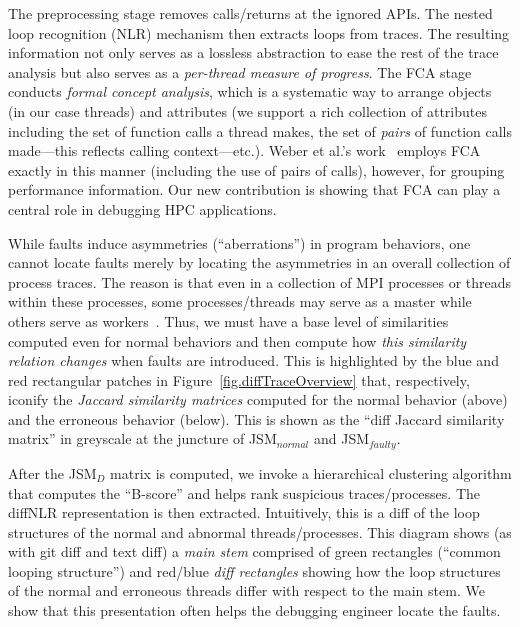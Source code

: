 The preprocessing stage removes calls/returns at the ignored APIs.
%
The nested loop recognition (NLR)
mechanism then extracts loops from traces.
The resulting information not only
serves as a lossless abstraction to
ease the rest of the trace analysis but also
serves as a {\em per-thread measure of progress}.
%
The FCA stage conducts {\em formal concept analysis}, which
is a systematic way to arrange objects (in our case threads)
and attributes (we support a rich collection of attributes
including the set of function calls a thread makes, the
set of {\em pairs} of function calls made---this reflects calling
context---etc.).
%
Weber et al.'s work~\cite{weberStructural,clbook} employs FCA exactly in
this manner (including the use of pairs of calls),
however, for grouping performance information.
%
Our new contribution is showing that FCA can play a central
role in debugging HPC applications.


While faults induce asymmetries (``aberrations'') in program behaviors,
one cannot locate faults merely by locating the asymmetries in
an overall collection of process traces.
%
The reason is that even in a collection of MPI processes or threads within
these processes, some processes/threads may serve as a master while others
serve as workers~\cite{patterns-for-par-prog-mattson}.
%
Thus, we must have a base level of similarities computed even for normal
behaviors and then compute how {\em this similarity relation changes} when
faults are introduced.
%
This is highlighted by
the blue and red rectangular patches in
Figure~\ref{fig.diffTraceOverview} that, respectively,
iconify the {\em Jaccard similarity
  matrices} computed for the normal behavior (above) and
the erroneous behavior (below).
%
This is shown as
the ``diff Jaccard similarity matrix'' in greyscale at the
juncture of JSM$_{normal}$ and JSM$_{faulty}$.


After the JSM$_{D}$ matrix is computed, we 
invoke a hierarchical clustering algorithm that computes the ``B-score''
and helps rank suspicious traces/processes.
%
The diffNLR representation is then extracted.
%
Intuitively, this is a diff of the loop structures of the normal and abnormal
threads/processes.
%
This diagram shows (as with git diff and text diff) a {\em main stem} comprised of green rectangles
(``common looping structure'') and red/blue {\em diff rectangles} showing how the loop structures of
the normal and erroneous threads differ with respect to the main stem.
%
We show that this presentation often helps the debugging engineer
locate the faults.


